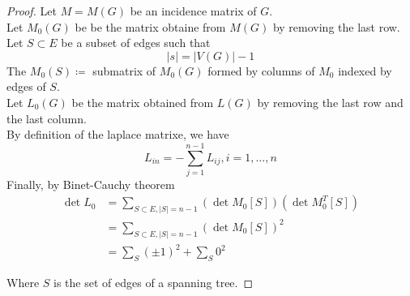 \documentclass[../main.tex]{subfiles}
\begin{document}
\begin{proof}
	Let $M=M( G) $ be an incidence matrix of $G$.\\
	Let $M_0( G) $ be be the matrix obtaine from $M( G) $ by removing the last row.\\
	Let $S \subset E$ be a subset of edges such that 
	\[ 
		|s| = |V( G) | -1
	\]
	The $M_0( S) \coloneqq $ submatrix of $M_0( G) $ formed by columns of $M_0$ indexed by edges of $S$.\\
	Let $L_0( G)$ be the matrix obtained from $L( G) $ by removing the last row and the last column.\\
	By definition of the laplace matrixe, we have
	\[ 
	L_{in} = - \sum_{j=1}^{ n-1} L_{ij} , i = 1, \ldots, n
	\]
			Finally, by Binet-Cauchy theorem
			 \begin{align*}
				 \det L_0 &= \sum_{S \subset E, |S| = n-1}^{ }( \det M_0[S]) ( \det M_0^{T}[S]) \\
				 &= \sum_{S \subset E, |S| = n-1}^{ } (\det M_0[S]) ^{2}\\
				 &= \sum_{S}^{ }( \pm 1) ^{2} + \sum_{S}^{ }0 ^{2}
			\end{align*}
			
			Where $S$ is the set of edges of a spanning tree.

\end{proof}




	
\end{document}
